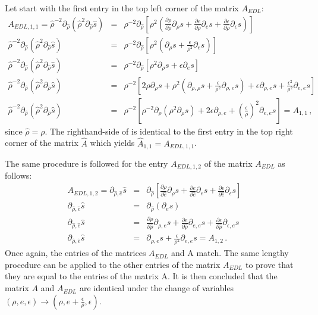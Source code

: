 \documentclass[times,doublespace]{fldauth}%
\newcommand{\sdd}{\ensuremath{\rho^{-2}\partial_{\rho}(\rho^2 \partial_{\rho} s)}}
\newcommand{\sddhat}{\ensuremath{\hat{\rho}^{-2}\partial_{\hat{\rho}}(\hat{\rho}^2 \partial_{\hat{\rho}} \hat{s})}}
\begin{document}
%
Let start with the first entry in the top left corner of the matrix $A_{EDL}$:
%
\begin{eqnarray}\label{eq:first_entry_A_hat}
A_{EDL,1,1} = \sddhat& =& \rho^{-2} \partial_{\hat{\rho}} \left[ \rho^2 \left( \frac{\partial \rho}{\partial \hat{\rho}} \partial_\rho s + \frac{\partial e}{\partial \hat{\rho}} \partial_e s + \frac{\partial \epsilon}{\partial \hat{\rho}} \partial_\epsilon s \right) \right] \nonumber \\
\sddhat& =& \rho^{-2} \partial_{\hat{\rho}} \left[ \rho^2 \left( \partial_\rho s + \frac{\epsilon}{\rho^2} \partial_e s \right) \right] \nonumber \\
\sddhat& =& \rho^{-2} \partial_{\hat{\rho}} \left[ \rho^2 \partial_\rho s + \epsilon \partial_e s \right] \nonumber \\
\sddhat& =& \rho^{-2} \left[ 2\rho \partial_\rho s + \rho^2 \left( \partial_{\rho,\rho} s + \frac{\epsilon}{\rho^2} \partial_{\rho,e} s \right) + \epsilon \partial_{\rho,e} s + \frac{\epsilon^2}{\rho^2}\partial_{e,e} s \right] \nonumber \\
\sddhat& =& \rho^{-2} \left[ \sdd + 2 \epsilon \partial_{\rho,e} + \left( \frac{\epsilon}{\rho} \right)^2 \partial_{e,e} s \right] = A_{1,1} \, ,
\end{eqnarray}
%
since $\hat{\rho} = \rho$. The righthand-side of  is identical to the first entry in the top right corner of the matrix $\hat{A}$ which yields $\hat{A}_{1,1} = A_{EDL,1,1}$. 

The same procedure is followed for the entry $A_{EDL,1,2}$ of the matrix $A_{EDL}$ as follows:
%
\begin{eqnarray}\label{eq:scd_entry_A_hat}
A_{EDL,1,2} = \partial_{\hat{\rho},\hat{e}} \hat{s}& =& \partial_{\hat{\rho}} \left[ \frac{\partial \rho}{\partial \hat{e}} \partial_\rho s + \frac{\partial e}{\partial \hat{e}} \partial_e s + \frac{\partial \epsilon}{\partial \hat{e}} \partial_\epsilon s \right] \nonumber \\ 
\partial_{\hat{\rho},\hat{e}} \hat{s}& =& \partial_{\hat{\rho}} \left( \partial_e s \right) \nonumber \\
\partial_{\hat{\rho},\hat{e}} \hat{s}& = &\frac{\partial \rho}{\partial \hat{\rho}} \partial_{\rho,e} s + \frac{\partial e}{\partial \hat{\rho}} \partial_{e,e} s + \frac{\partial \epsilon}{\partial \hat{\rho}} \partial_{\epsilon,e} s \nonumber \\
\partial_{\hat{\rho},\hat{e}} \hat{s}& = &\partial_{\rho,e} s + \frac{\epsilon}{\rho^2} \partial_{e,e} s = A_{1,2} \, .
\end{eqnarray}
%
Once again, the entries of the matrices $A_{EDL}$ and A match. The same lengthy procedure can be applied to the other entries of the matrix $A_{EDL}$ to prove that they are equal to the entries of the matrix A. It is then concluded that the matrix $A$ and $A_{EDL}$ are identical under the change of variables $(\rho, e, \epsilon) \rightarrow (\rho, e+ \frac{\epsilon}{\rho}, \epsilon)$.\\
\end{document}
